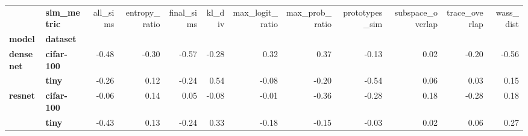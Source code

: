 \begin{tabular}{llrrrrrrrrrr}
\toprule
       & \textbf{sim\_metric} &  all\_sims &  entropy\_ratio &  final\_sims &  kl\_div &  max\_logit\_ratio &  max\_prob\_ratio &  prototypes\_sim &  subspace\_overlap &  trace\_overlap &  wass\_dist \\
\textbf{model} & \textbf{dataset} &           &                &             &         &                  &                 &                 &                   &                &            \\
\midrule
\multirow{2}{*}{\textbf{densenet}} & \textbf{cifar-100} &     -0.48 &          -0.30 &       -0.57 &   -0.28 &             0.32 &            0.37 &           -0.13 &              0.02 &          -0.20 &      -0.56 \\
       & \textbf{tiny} &     -0.26 &           0.12 &       -0.24 &    0.54 &            -0.08 &           -0.20 &           -0.54 &              0.06 &           0.03 &       0.15 \\
\cline{1-12}
\multirow{2}{*}{\textbf{resnet}} & \textbf{cifar-100} &     -0.06 &           0.14 &        0.05 &   -0.08 &            -0.01 &           -0.36 &           -0.28 &              0.18 &          -0.28 &       0.18 \\
       & \textbf{tiny} &     -0.43 &           0.13 &       -0.24 &    0.33 &            -0.18 &           -0.15 &           -0.03 &              0.02 &           0.06 &       0.27 \\
\bottomrule
\end{tabular}
